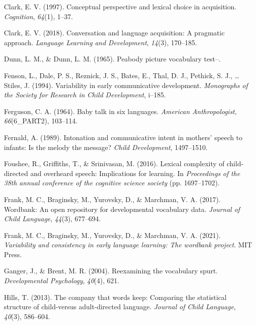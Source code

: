\documentclass[10pt, letterpaper]{article}
\newenvironment{CSLReferences}%
  {}%
  {\par}
\begin{document}
\begin{CSLReferences}{1}{0}
\leavevmode\hypertarget{ref-clark1997conceptual}{}%
Clark, E. V. (1997). Conceptual perspective and lexical choice in
acquisition. \emph{Cognition}, \emph{64}(1), 1--37.

\leavevmode\hypertarget{ref-clark2018conversation}{}%
Clark, E. V. (2018). Conversation and language acquisition: A pragmatic
approach. \emph{Language Learning and Development}, \emph{14}(3),
170--185.

\leavevmode\hypertarget{ref-dunn1965peabody}{}%
Dunn, L. M., \& Dunn, L. M. (1965). Peabody picture vocabulary test--.

\leavevmode\hypertarget{ref-fenson1994variability}{}%
Fenson, L., Dale, P. S., Reznick, J. S., Bates, E., Thal, D. J.,
Pethick, S. J., \ldots{} Stiles, J. (1994). Variability in early
communicative development. \emph{Monographs of the Society for Research
in Child Development}, i--185.

\leavevmode\hypertarget{ref-ferguson1964baby}{}%
Ferguson, C. A. (1964). Baby talk in six languages. \emph{American
Anthropologist}, \emph{66}(6\_PART2), 103--114.

\leavevmode\hypertarget{ref-fernald1989intonation}{}%
Fernald, A. (1989). Intonation and communicative intent in mothers'
speech to infants: Is the melody the message? \emph{Child Development},
1497--1510.

\leavevmode\hypertarget{ref-foushee2016lexical}{}%
Foushee, R., Griffiths, T., \& Srinivasan, M. (2016). Lexical complexity
of child-directed and overheard speech: Implications for learning. In
\emph{Proceedings of the 38th annual conference of the cognitive science
society} (pp. 1697--1702).

\leavevmode\hypertarget{ref-frank2017wordbank}{}%
Frank, M. C., Braginsky, M., Yurovsky, D., \& Marchman, V. A. (2017).
Wordbank: An open repository for developmental vocabulary data.
\emph{Journal of Child Language}, \emph{44}(3), 677--694.

\leavevmode\hypertarget{ref-frank2021variability}{}%
Frank, M. C., Braginsky, M., Yurovsky, D., \& Marchman, V. A. (2021).
\emph{Variability and consistency in early language learning: The
wordbank project}. MIT Press.

\leavevmode\hypertarget{ref-ganger2004reexamining}{}%
Ganger, J., \& Brent, M. R. (2004). Reexamining the vocabulary spurt.
\emph{Developmental Psychology}, \emph{40}(4), 621.

\leavevmode\hypertarget{ref-hills2013company}{}%
Hills, T. (2013). The company that words keep: Comparing the statistical
structure of child-versus adult-directed language. \emph{Journal of
Child Language}, \emph{40}(3), 586--604.


\end{CSLReferences}
\end{document}
